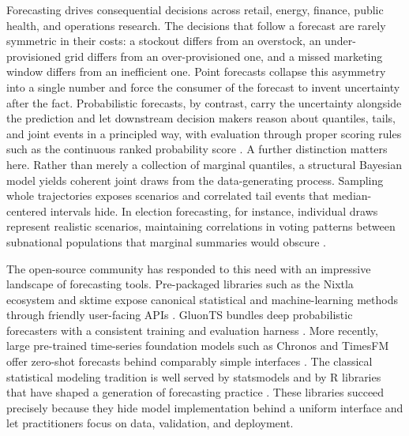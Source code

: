 \documentclass[11pt,3p,review,authoryear]{elsarticle}
\begin{document}
Forecasting drives consequential decisions across retail, energy, finance, public health, and operations research. The decisions that follow a forecast are rarely symmetric in their costs: a stockout differs from an overstock, an under-provisioned grid differs from an over-provisioned one, and a missed marketing window differs from an inefficient one. Point forecasts collapse this asymmetry into a single number and force the consumer of the forecast to invent uncertainty after the fact. Probabilistic forecasts, by contrast, carry the uncertainty alongside the prediction and let downstream decision makers reason about quantiles, tails, and joint events in a principled way, with evaluation through proper scoring rules such as the continuous ranked probability score \citep{gneiting2007scoring, gneiting2014probabilistic}. A further distinction matters here. Rather than merely a collection of marginal quantiles, a structural Bayesian model yields coherent joint draws from the data-generating process. Sampling whole trajectories exposes scenarios and correlated tail events that median-centered intervals hide. In election forecasting, for instance, individual draws represent realistic scenarios, maintaining correlations in voting patterns between subnational populations that marginal summaries would obscure \citep{heidemanns2020updated}.

The open-source community has responded to this need with an impressive landscape of forecasting tools. Pre-packaged libraries such as the Nixtla ecosystem and sktime expose canonical statistical and machine-learning methods through friendly user-facing APIs \citep{nixtla2024, loning2019sktime}. GluonTS bundles deep probabilistic forecasters with a consistent training and evaluation harness \citep{alexandrov2020gluonts}. More recently, large pre-trained time-series foundation models such as Chronos and TimesFM offer zero-shot forecasts behind comparably simple interfaces \citep{ansari2024chronos, das2023timesfm}. The classical statistical modeling tradition is well served by statsmodels \citep{statsmodels} and by R libraries that have shaped a generation of forecasting practice \citep{hyndman2021forecasting}. These libraries succeed precisely because they hide model implementation behind a uniform interface and let practitioners focus on data, validation, and deployment.
\end{document}
